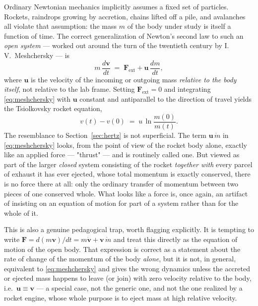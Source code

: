 Ordinary Newtonian mechanics implicitly assumes a fixed set of
particles. Rockets, raindrops growing by accretion, chains lifted
off a pile, and avalanches all violate that assumption: the mass $m$
of the body under study is itself a function of time. The correct
generalization of Newton's second law to such an \emph{open system}
--- worked out around the turn of the twentieth century by
I.\,V.\ Meshchersky --- is
\begin{equation}
  m\,\frac{d\mathbf v}{dt} \;=\; \mathbf F_{\mathrm{ext}}
  + \mathbf u\,\frac{dm}{dt} ,
  \label{eq:meshchersky}
\end{equation}
where $\mathbf u$ is the velocity of the incoming or outgoing mass
\emph{relative to the body itself}, not relative to the lab frame.
Setting $\mathbf F_{\mathrm{ext}}=0$ and integrating
\eqref{eq:meshchersky} with $\mathbf u$ constant and antiparallel to
the direction of travel yields the Tsiolkovsky rocket equation,
\begin{equation}
  v(t) - v(0) \;=\; u\,\ln\frac{m(0)}{m(t)} .
  \label{eq:tsiolkovsky}
\end{equation}
The resemblance to Section~\ref{sec:hertz} is not superficial. The
term $\mathbf u\,\dot m$ in \eqref{eq:meshchersky} looks, from the
point of view of the rocket body alone, exactly like an applied
force --- "thrust" --- and is routinely called one. But viewed as
part of the larger \emph{closed} system consisting of the rocket
\emph{together with} every parcel of exhaust it has ever ejected,
whose total momentum is exactly conserved, there is no force there
at all: only the ordinary transfer of momentum between two pieces of
one conserved whole. What looks like a force is, once again, an
artifact of insisting on an equation of motion for part of a system
rather than for the whole of it.

This is also a genuine pedagogical trap, worth flagging explicitly.
It is tempting to write $\mathbf F = d(m\mathbf v)/dt = m\dot{\mathbf
v} + \mathbf v\,\dot m$ and treat this directly as the equation of
motion of the open body. That expression is correct as a statement
about the rate of change of the momentum of the body \emph{alone},
but it is not, in general, equivalent to \eqref{eq:meshchersky} and
gives the wrong dynamics unless the accreted or ejected mass happens
to leave (or join) with zero velocity relative to the body, i.e.\
$\mathbf u \equiv \mathbf v$ --- a special case, not the generic one,
and not the one realized by a rocket engine, whose whole purpose is
to eject mass at high relative velocity.

